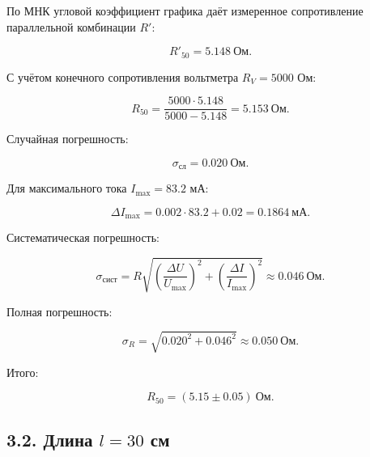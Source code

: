\documentclass[12pt,a4paper]{article}
\begin{document}
По МНК угловой коэффициент графика даёт измеренное сопротивление
параллельной комбинации $R'$:

\begin{equation}
R'_{50}=5.148\ \text{Ом}.
\end{equation}

С учётом конечного сопротивления вольтметра $R_V=5000$ Ом:

\begin{equation}
R_{50}
=
\frac{5000\cdot5.148}{5000-5.148}
=
5.153\ \text{Ом}.
\end{equation}

Случайная погрешность:

\begin{equation}
\sigma_{\text{сл}}
=
0.020\ \text{Ом}.
\end{equation}

Для максимального тока $I_{\max}=83.2$ мА:

\begin{equation}
\Delta I_{\max}
=
0.002\cdot83.2+0.02
=
0.1864\ \text{мА}.
\end{equation}

Систематическая погрешность:

\begin{equation}
\sigma_{\text{сист}}
=
R
\sqrt{
\left(
\frac{\Delta U}{U_{\max}}
\right)^2+
\left(
\frac{\Delta I}{I_{\max}}
\right)^2
}
\approx
0.046\ \text{Ом}.
\end{equation}

Полная погрешность:

\begin{equation}
\sigma_R=
\sqrt{
0.020^2+0.046^2
}
\approx
0.050\ \text{Ом}.
\end{equation}

Итого:

\begin{equation}
\boxed{
R_{50}=(5.15\pm0.05)\ \text{Ом}
}.
\end{equation}


\subsection*{3.2. Длина $l=30$ см}
\end{document}

